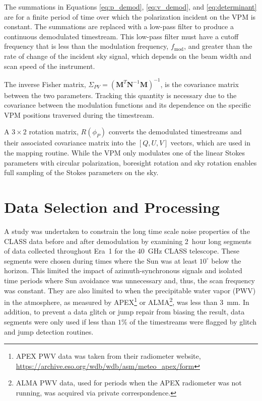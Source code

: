 \documentclass[twocolumn, tighten, numberedappendix, twocolappendix]{aastex63}
\begin{document}
\noindent The summations in Equations \ref{eq:p_demod}, \ref{eq:v_demod}, and \ref{eq:determinant} are for a finite period of time over which the polarization incident on the VPM is constant. The summations are replaced with a low-pass filter to produce a continuous demodulated timestream. This low-pass filter must have a cutoff frequency that is less than the modulation frequency, $f_\mathrm{mod}$, and greater than the rate of change of the incident sky signal, which depends on the beam width and scan speed of the instrument.

The inverse Fisher matrix, $\Sigma_{PV} = (\mathbf{M}^T \mathbf{N}^{-1} \mathbf{M})^{-1}$, is the covariance matrix between the two parameters. Tracking this quantity is necessary due to the covariance between the modulation functions and its dependence on the specific VPM positions traversed during the timestream.

A $3\times2$ rotation matrix, $R(\phi_{P})$ converts the demodulated timestreams and their associated covariance matrix into the $[Q, U, V]$ vectors, which are used in the mapping routine. While the VPM only modulates one of the linear Stokes parameters with circular polarization, boresight rotation and sky rotation enables full sampling of the Stokes parameters on the sky.

\section{\label{sec:methods}Data Selection and Processing}

A study was undertaken to constrain the long time scale noise properties of the CLASS data before and after demodulation by examining 2~hour long segments of data collected throughout Era~1 for the 40~GHz CLASS telescope. These segments were chosen during times where the Sun was at least $10^\circ$ below the horizon. This limited the impact of azimuth-synchronous signals and isolated time periods where Sun avoidance was unnecessary and, thus, the scan frequency was constant. They are also limited to when the precipitable water vapor (PWV) in the atmosphere, as measured by APEX\footnote{APEX PWV data was taken from their radiometer website,  \url{https://archive.eso.org/wdb/wdb/asm/meteo_apex/form}} or ALMA\footnote{ALMA PWV data, used for periods when the APEX radiometer was not running, was acquired via private correspondence.}, was less than 3~mm. In addition, to prevent a data glitch or jump repair from biasing the result, data segments were only used if less than $1\%$ of the timestreams were flagged by glitch and jump detection routines. 
\end{document}

